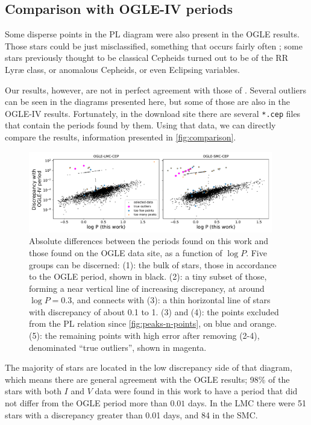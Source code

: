 \subsection{Comparison with OGLE-IV periods \label{sec:ogle-comparison}}


Some disperse points in the PL diagram were also present in the OGLE results. 
Those stars could be just misclassified, something that occurs fairly often \citep[see for example Table 1 of][]{OGLE2016};
some stars previously thought to be classical Cepheids turned out to be of the RR Lyr\ae{} class,
or anomalous Cepheids, or even Eclipsing variables.

Our results, however, are not in perfect agreement with those of \cite{OGLE2016}.
Several outliers can be seen in the diagrams presented here, but some of those are also in the OGLE-IV results.
Fortunately, in the download site there are several \texttt{*.cep} files that contain the periods found by them.
Using that data, we can directly compare the results, information presented in \autoref{fig:comparison}.

\begin{figure}
	\centering
	\includegraphics[width=0.95\textwidth]{img/discrepancies.pdf}
	\caption[Comparison with OGLE-IV periods]{
		Absolute differences between the periods found on this work and those found on the OGLE data site, as a function of $\log P$.
		Five groups can be discerned: (1): the bulk of stars, those in accordance to the OGLE period, shown in black. 
		(2): a tiny subset of those, forming a near vertical line of increasing discrepancy, at around  $\log P = 0.3$, and connects with
		(3): a thin horizontal line of stars with discrepancy of about 0.1 to 1.
		(3) and (4): the points excluded from the PL relation since \autoref{fig:peaks-n-points}, on blue and orange.
		(5): the remaining points with high error after removing (2-4), denominated \enquote{true outliers}, shown in magenta.
	}
	\label{fig:comparison}
\end{figure}

The majority of stars are located in the low discrepancy side of that diagram, which means there are general agreement with the OGLE results;
98\% of the stars with both $I$ and $V$ data were found in this work to have a period that did not differ from the OGLE period more than $0.01$ days.
In the LMC there were 51 stars with a discrepancy greater than 0.01 days, and 84 in the SMC.

